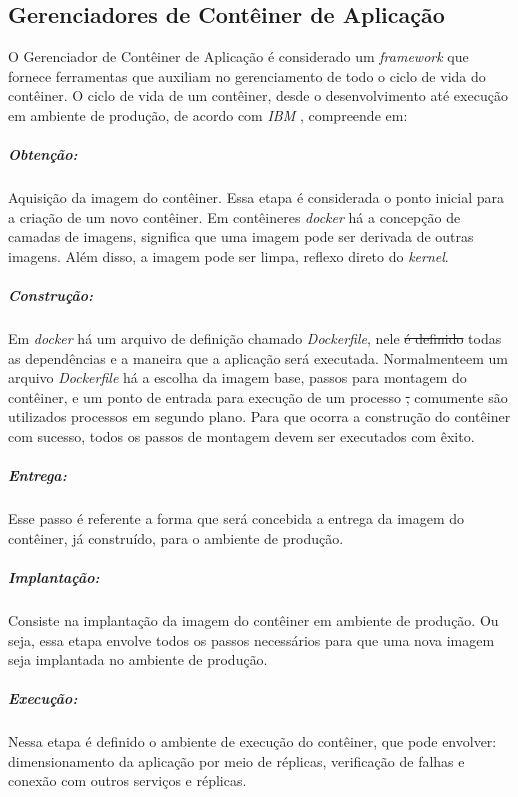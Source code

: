 \documentclass[
	12pt,				%
	openright,			%
	oneside,			%
	a4paper,			%
	brazil				%
	]{abntex2}
\providecommand{\DIFaddtex}[1]{{\protect\color{blue}\uwave{#1}}} %
\providecommand{\DIFdeltex}[1]{{\protect\color{red}\sout{#1}}}                      %
\providecommand{\DIFaddbegin}{} %
\providecommand{\DIFaddend}{} %
\providecommand{\DIFdelbegin}{} %
\providecommand{\DIFdelend}{} %
\providecommand{\DIFadd}[1]{\texorpdfstring{\DIFaddtex{#1}}{#1}} %
\providecommand{\DIFdel}[1]{\texorpdfstring{\DIFdeltex{#1}}{}} %
\newcommand{\DIFscaledelfig}{0.5}
\newlength{\DIFdelgraphicswidth} %
\newlength{\DIFdelgraphicsheight} %
\newcommand{\DIFaddincludegraphics}[2][]{{\color{blue}\fbox{\DIFOincludegraphics[#1]{#2}}}} %
\newcommand{\DIFdelincludegraphics}[2][]{%
\sbox{\DIFdelgraphicsbox}{\DIFOincludegraphics[#1]{#2}}%
\settoboxwidth{\DIFdelgraphicswidth}{\DIFdelgraphicsbox} %
\settoboxtotalheight{\DIFdelgraphicsheight}{\DIFdelgraphicsbox} %
\scalebox{\DIFscaledelfig}{%
\parbox[b]{\DIFdelgraphicswidth}{\usebox{\DIFdelgraphicsbox}\\[-\baselineskip] \rule{\DIFdelgraphicswidth}{0em}}\llap{\resizebox{\DIFdelgraphicswidth}{\DIFdelgraphicsheight}{%
\setlength{\unitlength}{\DIFdelgraphicswidth}%
\begin{picture}(1,1)%
\thicklines\linethickness{2pt} %
{\color[rgb]{1,0,0}\put(0,0){\framebox(1,1){}}}%
{\color[rgb]{1,0,0}\put(0,0){\line( 1,1){1}}}%
{\color[rgb]{1,0,0}\put(0,1){\line(1,-1){1}}}%
\end{picture}%
}\hspace*{3pt}}} %
} %
\DeclareRobustCommand{\DIFaddbegin}{\DIFOaddbegin \let\includegraphics\DIFaddincludegraphics} %
\DeclareRobustCommand{\DIFaddend}{\DIFOaddend \let\includegraphics\DIFOincludegraphics} %
\DeclareRobustCommand{\DIFdelbegin}{\DIFOdelbegin \let\includegraphics\DIFdelincludegraphics} %
\DeclareRobustCommand{\DIFdelend}{\DIFOaddend \let\includegraphics\DIFOincludegraphics} %
\begin{document}


\subsection{Gerenciadores de Contêiner de Aplicação}
O Gerenciador de Contêiner de Aplicação é considerado um \textit{framework} que fornece ferramentas que auxiliam no gerenciamento de todo o ciclo de vida do contêiner. O ciclo de vida de um contêiner, desde o desenvolvimento até execução em ambiente de produção, de acordo com \textit{IBM} \cite{ibm-ciclo}, compreende em:

\subparagraph{Obtenção:}
Aquisição da imagem do contêiner. Essa etapa é considerada o ponto inicial para a criação de um novo contêiner. Em contêineres \textit{docker} há a concepção de camadas de imagens, significa que uma imagem pode ser derivada de outras imagens. Além disso, a imagem pode ser limpa, reflexo direto do \textit{kernel}.
\subparagraph{Construção:}
Em \textit{docker} há um arquivo de definição chamado \textit{Dockerfile}, nele \DIFdelbegin \DIFdel{é definido }\DIFdelend \DIFaddbegin \DIFadd{são definidas }\DIFaddend todas as dependências e a maneira que a aplicação será executada. Normalmente\DIFaddbegin \DIFadd{, }\DIFaddend em um arquivo \textit{Dockerfile} há a escolha da imagem base, passos para montagem do contêiner, e um ponto de entrada para execução de um processo \DIFdelbegin \DIFdel{, }\DIFdelend \DIFaddbegin \DIFadd{principal (}\DIFaddend comumente são utilizados processos em segundo plano\DIFaddbegin \DIFadd{)}\DIFaddend . Para que ocorra a construção do contêiner com sucesso, todos os passos de montagem devem ser executados com êxito.
\subparagraph{Entrega:}
Esse passo é referente a forma que será concebida a entrega da imagem do contêiner, já construído, para o ambiente de produção. \DIFaddbegin \DIFadd{\textcolor{red}{TODO: o que é entregar então?  Use um exemplo prático.}
}\DIFaddend \subparagraph{Implantação:}
Consiste na implantação da imagem do contêiner em ambiente de  produção. Ou seja, essa etapa envolve todos os passos necessários para que uma nova imagem seja implantada no ambiente de produção. \DIFaddbegin \DIFadd{\textcolor{red}{TODO: o que é implantar então? Use um exemplo prático.}
}\DIFaddend \subparagraph{Execução:}
Nessa etapa é definido o ambiente de execução do contêiner, que pode envolver: dimensionamento da aplicação por meio de réplicas, verificação de falhas e conexão com outros serviços e réplicas.
\end{document}
